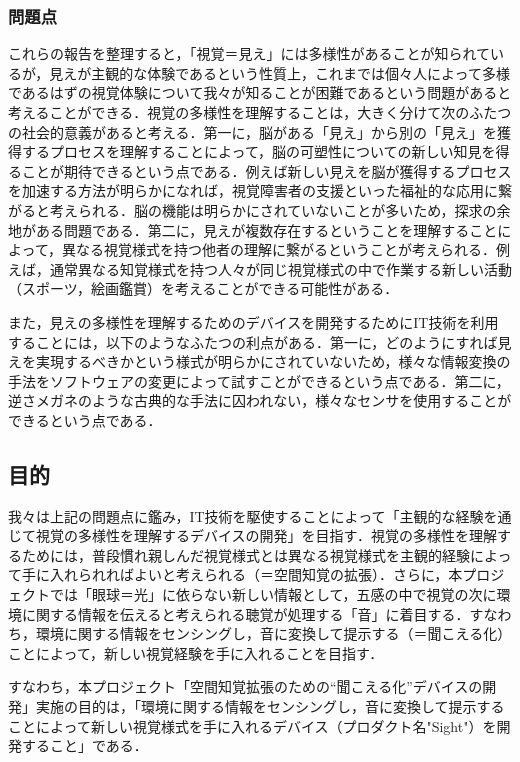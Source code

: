 \subsubsection{問題点}
これらの報告を整理すると，「視覚＝見え」には多様性があることが知られているが，見えが主観的な体験であるという性質上，これまでは個々人によって多様であるはずの視覚体験について我々が知ることが困難であるという問題があると考えることができる．視覚の多様性を理解することは，大きく分けて次のふたつの社会的意義があると考える．第一に，脳がある「見え」から別の「見え」を獲得するプロセスを理解することによって，脳の可塑性についての新しい知見を得ることが期待できるという点である．例えば新しい見えを脳が獲得するプロセスを加速する方法が明らかになれば，視覚障害者の支援といった福祉的な応用に繋がると考えられる．脳の機能は明らかにされていないことが多いため，探求の余地がある問題である．第二に，見えが複数存在するということを理解することによって，異なる視覚様式を持つ他者の理解に繋がるということが考えられる．例えば，通常異なる知覚様式を持つ人々が同じ視覚様式の中で作業する新しい活動（スポーツ，絵画鑑賞）を考えることができる可能性がある．

また，見えの多様性を理解するためのデバイスを開発するためにIT技術を利用することには，以下のようなふたつの利点がある．第一に，どのようにすれば見えを実現するべきかという様式が明らかにされていないため，様々な情報変換の手法をソフトウェアの変更によって試すことができるという点である．第二に，逆さメガネのような古典的な手法に囚われない，様々なセンサを使用することができるという点である．

\subsection{目的}
我々は上記の問題点に鑑み，IT技術を駆使することによって「主観的な経験を通じて視覚の多様性を理解するデバイスの開発」を目指す．視覚の多様性を理解するためには，普段慣れ親しんだ視覚様式とは異なる視覚様式を主観的経験によって手に入れられればよいと考えられる（＝空間知覚の拡張）．さらに，本プロジェクトでは「眼球＝光」に依らない新しい情報として，五感の中で視覚の次に環境に関する情報を伝えると考えられる聴覚が処理する「音」に着目する．すなわち，環境に関する情報をセンシングし，音に変換して提示する（＝聞こえる化）ことによって，新しい視覚経験を手に入れることを目指す．

すなわち，本プロジェクト「空間知覚拡張のための``聞こえる化''デバイスの開発」実施の目的は，「環境に関する情報をセンシングし，音に変換して提示することによって新しい視覚様式を手に入れるデバイス（プロダクト名"Sight"）を開発すること」である．












